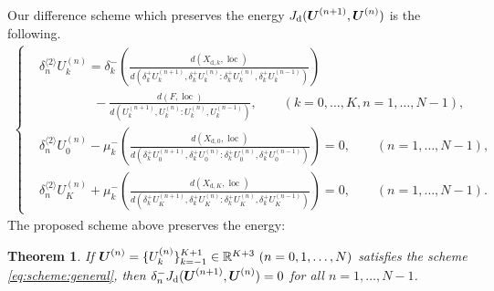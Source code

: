 \documentclass[dvipdfmx-if-dvi,autodetect-engine,ja=standard]{amsart}
\numberwithin{equation}{section} %
\def\vect#1{\mbox{\boldmath $#1$}} %
\DeclareMathOperator{\loc}{loc}
\newtheorem{theorem}[definition]{Theorem}
\begin{document}
Our difference scheme which
preserves the energy
$J_{\mathrm{d}}(\vect{U}^{(n+1)}, \vect{U}^{(n)})$
is the following.
\begin{align}\label{eq:scheme:general}
    \left\{
    \begin{alignedat}{2}
    &\delta_n^{\langle 2\rangle} U_k^{(n)}
    = \delta_k^- \left(
        \frac{d(X_{\mathrm{d},k},\loc)}{d(\delta_k^+U_k^{(n+1)}, \delta_k^+ U_k^{(n)} : \delta_k^+ U_k^{(n)}, \delta_k^+ U_k^{(n-1)})}
        \right) & \ \\
    &\qquad \qquad \ -
        \frac{d(F,\loc)}{d(U_k^{(n+1)},U_k^{(n)} : U_k^{(n)}, U_k^{(n-1)})},
        \qquad (k=0,\ldots,K, n=1,\ldots,N-1),\\
    &\delta_n^{\langle 2\rangle} U_0^{(n)}
        - \mu_k^- \left(
            \frac{d(X_{\mathrm{d},0},\loc)}{d(\delta_k^+U_0^{(n+1)}, \delta_k^+ U_0^{(n)} : \delta_k^+ U_0^{(n)}, \delta_k^+ U_0^{(n-1)})}
            \right)
            = 0,
        \qquad (n=1,\ldots,N-1),\\
    &\delta_n^{\langle 2\rangle} U_K^{(n)}
       + \mu_k^- \left(
            \frac{d(X_{\mathrm{d},K},\loc)}{d(\delta_k^+U_K^{(n+1)}, \delta_k^+ U_K^{(n)} : \delta_k^+ U_K^{(n)}, \delta_k^+ U_K^{(n-1)})}
            \right)
            = 0,
        \qquad (n=1,\ldots,N-1).
    \end{alignedat}
    \right.
\end{align}
The proposed scheme above preserves the energy:
\begin{theorem}\label{thm:energy:conserv}
If
$\vect{U}^{(n)} = \{ U_k^{(n)} \}_{k=-1}^{K+1} \in \mathbb{R}^{K+3} \ (n=0,1,\ldots,N)$
satisfies the scheme \eqref{eq:scheme:general},
then
$\delta_n^- J_{\mathrm{d}}(\vect{U}^{(n+1)}, \vect{U}^{(n)}) = 0$
for all
$n =1,\ldots,N-1$.
\end{theorem}
\end{document}
